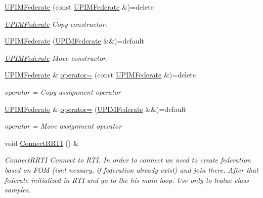 \begin{DoxyCompactItemize}
\mbox{\label{classUPIM_1_1UPIMFederate_a0dbc30611f5fd327e70df96e025576b3}} 
\hyperlink{classUPIM_1_1UPIMFederate_a0dbc30611f5fd327e70df96e025576b3}{U\+P\+I\+M\+Federate} (const \hyperlink{classUPIM_1_1UPIMFederate}{U\+P\+I\+M\+Federate} \&)=delete
\begin{DoxyCompactList}\small\item\em \hyperlink{classUPIM_1_1UPIMFederate}{U\+P\+I\+M\+Federate} Copy constructor. \end{DoxyCompactList}\item 
\mbox{\label{classUPIM_1_1UPIMFederate_a8bdb9195bbd9e0294d97323f2a4b80b9}} 
\hyperlink{classUPIM_1_1UPIMFederate_a8bdb9195bbd9e0294d97323f2a4b80b9}{U\+P\+I\+M\+Federate} (\hyperlink{classUPIM_1_1UPIMFederate}{U\+P\+I\+M\+Federate} \&\&)=default
\begin{DoxyCompactList}\small\item\em \hyperlink{classUPIM_1_1UPIMFederate}{U\+P\+I\+M\+Federate} Move constructor. \end{DoxyCompactList}\item 
\hyperlink{classUPIM_1_1UPIMFederate}{U\+P\+I\+M\+Federate} \& \hyperlink{classUPIM_1_1UPIMFederate_ab2cf7775c5e263df6014422e8202f493}{operator=} (const \hyperlink{classUPIM_1_1UPIMFederate}{U\+P\+I\+M\+Federate} \&)=delete
\begin{DoxyCompactList}\small\item\em operator = Copy assignment operator \end{DoxyCompactList}\item 
\hyperlink{classUPIM_1_1UPIMFederate}{U\+P\+I\+M\+Federate} \& \hyperlink{classUPIM_1_1UPIMFederate_a6241cb2905a5d09c7845a16d5f42fe98}{operator=} (\hyperlink{classUPIM_1_1UPIMFederate}{U\+P\+I\+M\+Federate} \&\&)=default
\begin{DoxyCompactList}\small\item\em operator = Move assignment operator \end{DoxyCompactList}\item 
\mbox{\label{classUPIM_1_1UPIMFederate_aa41ade9fdf642cf095210adfd44fd198}} 
void \hyperlink{classUPIM_1_1UPIMFederate_aa41ade9fdf642cf095210adfd44fd198}{Connect\+R\+R\+TI} () \&
\begin{DoxyCompactList}\small\item\em Connect\+R\+R\+TI Connect to R\+TI. In order to connect we need to create federation based on F\+OM (isn\textquotesingle{}t nessary, if federation already exist) and join there. After that federate initialized in R\+TI and go to the his main loop. Use only to lvalue class samples. \end{DoxyCompactList}\item 

\end{DoxyCompactItemize}
